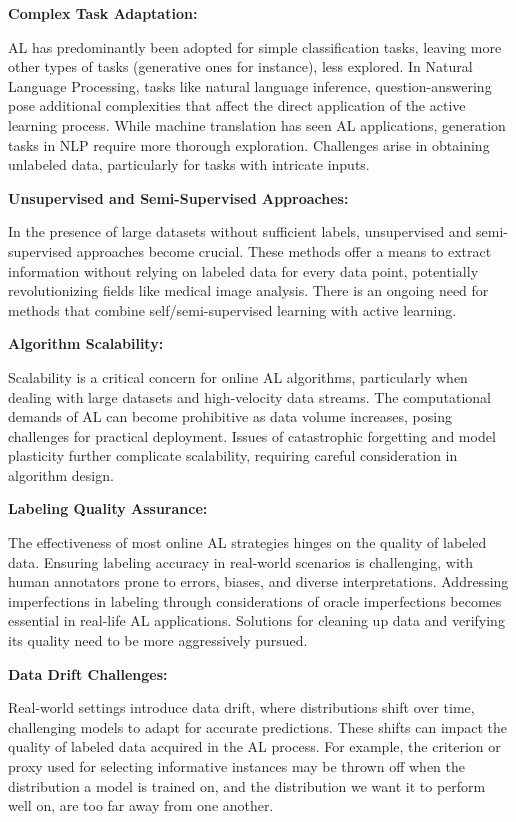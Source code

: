 \documentclass[
  letterpaper,
  numbers=noenddot,
  DIV=11]{scrreprt}
\theoremstyle{definition}
\theoremstyle{plain}
\theoremstyle{plain}
\theoremstyle{remark}
\begin{document}
\textbf{Complex Task Adaptation:}

AL has predominantly been adopted for simple classification tasks,
leaving more other types of tasks (generative ones for instance), less
explored. In Natural Language Processing, tasks like natural language
inference, question-answering pose additional complexities that affect
the direct application of the active learning process. While machine
translation has seen AL applications, generation tasks in NLP require
more thorough exploration. Challenges arise in obtaining unlabeled data,
particularly for tasks with intricate inputs.

\textbf{Unsupervised and Semi-Supervised Approaches:}

In the presence of large datasets without sufficient labels,
unsupervised and semi-supervised approaches become crucial. These
methods offer a means to extract information without relying on labeled
data for every data point, potentially revolutionizing fields like
medical image analysis. There is an ongoing need for methods that
combine self/semi-supervised learning with active learning.

\textbf{Algorithm Scalability:}

Scalability is a critical concern for online AL algorithms, particularly
when dealing with large datasets and high-velocity data streams. The
computational demands of AL can become prohibitive as data volume
increases, posing challenges for practical deployment. Issues of
catastrophic forgetting and model plasticity further complicate
scalability, requiring careful consideration in algorithm design.

\textbf{Labeling Quality Assurance:}

The effectiveness of most online AL strategies hinges on the quality of
labeled data. Ensuring labeling accuracy in real-world scenarios is
challenging, with human annotators prone to errors, biases, and diverse
interpretations. Addressing imperfections in labeling through
considerations of oracle imperfections becomes essential in real-life AL
applications. Solutions for cleaning up data and verifying its quality
need to be more aggressively pursued.

\textbf{Data Drift Challenges:}

Real-world settings introduce data drift, where distributions shift over
time, challenging models to adapt for accurate predictions. These shifts
can impact the quality of labeled data acquired in the AL process. For
example, the criterion or proxy used for selecting informative instances
may be thrown off when the distribution a model is trained on, and the
distribution we want it to perform well on, are too far away from one
another.
\end{document}
